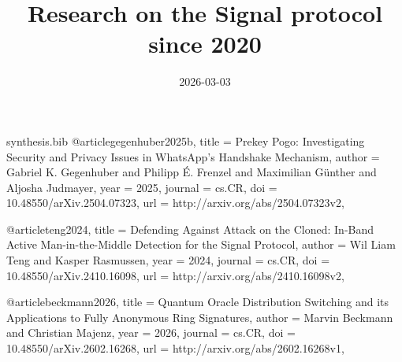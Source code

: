\begin{filecontents*}{synthesis.bib}
@article{gegenhuber2025b,
  title = {Prekey Pogo: Investigating Security and Privacy Issues in WhatsApp's Handshake Mechanism},
  author = {Gabriel K. Gegenhuber and Philipp É. Frenzel and Maximilian Günther and Aljosha Judmayer},
  year = {2025},
  journal = {cs.CR},
  doi = {10.48550/arXiv.2504.07323},
  url = {http://arxiv.org/abs/2504.07323v2},
}

@article{teng2024,
  title = {Defending Against Attack on the Cloned: In-Band Active Man-in-the-Middle Detection for the Signal Protocol},
  author = {Wil Liam Teng and Kasper Rasmussen},
  year = {2024},
  journal = {cs.CR},
  doi = {10.48550/arXiv.2410.16098},
  url = {http://arxiv.org/abs/2410.16098v2},
}

@article{beckmann2026,
  title = {Quantum Oracle Distribution Switching and its Applications to Fully Anonymous Ring Signatures},
  author = {Marvin Beckmann and Christian Majenz},
  year = {2026},
  journal = {cs.CR},
  doi = {10.48550/arXiv.2602.16268},
  url = {http://arxiv.org/abs/2602.16268v1},
}
\end{filecontents*}

\documentclass{article}
\usepackage[utf8]{inputenc}
\usepackage[colorlinks=true,allcolors=blue]{hyperref}
\usepackage{enumitem}
\usepackage{longtable}
\usepackage{booktabs}
\usepackage{array}
\usepackage[backend=biber,style=authoryear]{biblatex}



\title{Research on the Signal protocol since 2020}
\date{2026-03-03}


\maketitle

